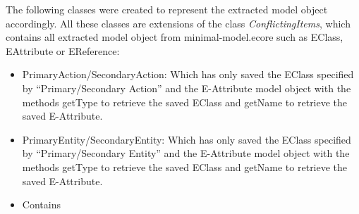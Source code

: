 The following classes were created to represent the extracted model object accordingly. All these classes are extensions of the class \textit{ConflictingItems}, which contains all extracted model object from minimal-model.ecore such as EClass, EAttribute or EReference:
\begin{itemize}
	\item PrimaryAction/SecondaryAction: Which has only saved the EClass specified by \enquote{Primary/Secondary Action} and the E-Attribute model object with the methods getType to retrieve the saved EClass and getName to retrieve the saved E-Attribute.
		\item PrimaryEntity/SecondaryEntity: Which has only saved the EClass specified by \enquote{Primary/Secondary Entity} and the E-Attribute model object with the methods getType to retrieve the saved EClass and getName to retrieve the saved E-Attribute.
		\item Contains
\end{itemize}
%
